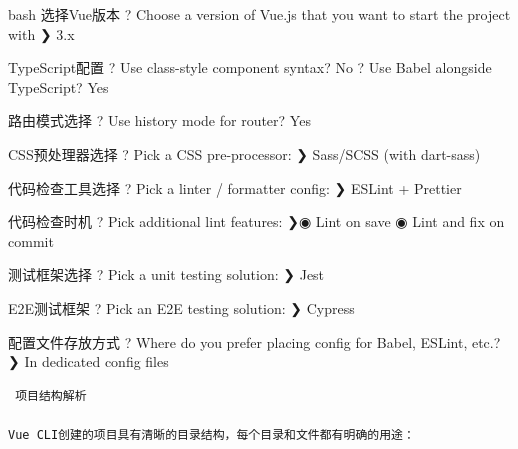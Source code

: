 {{bash  选择Vue版本 ? Choose a version of Vue.js that you want to start the project with ❯ 3.x

 TypeScript配置 ? Use class-style component syntax? No ? Use Babel alongside TypeScript? Yes

 路由模式选择 ? Use history mode for router? Yes

 CSS预处理器选择 ? Pick a CSS pre-processor: ❯ Sass/SCSS (with dart-sass)

 代码检查工具选择 ? Pick a linter / formatter config: ❯ ESLint + Prettier

 代码检查时机 ? Pick additional lint features: ❯◉ Lint on save ◉ Lint and fix on commit

 测试框架选择 ? Pick a unit testing solution: ❯ Jest

 E2E测试框架 ? Pick an E2E testing solution: ❯ Cypress

 配置文件存放方式 ? Where do you prefer placing config for Babel, ESLint, etc.? ❯ In dedicated config files

\begin{lstlisting}
 项目结构解析

Vue CLI创建的项目具有清晰的目录结构，每个目录和文件都有明确的用途：
\end{lstlisting}

}}
